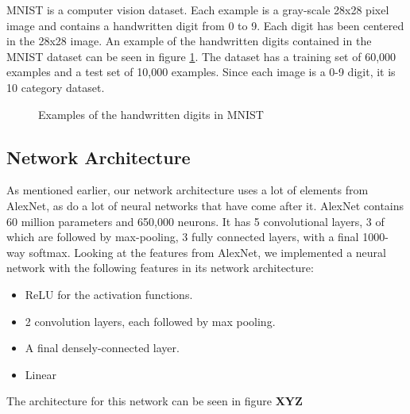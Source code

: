 \documentclass{article}
\begin{document}
MNIST is a computer vision dataset. Each example is a gray-scale 28x28 pixel image and contains a handwritten digit from 0 to 9. Each digit has been centered in the 28x28 image. An example of the handwritten digits contained in the MNIST dataset can be seen in figure \ref{fig:mnist}. The dataset has a training set of 60,000 examples and a test set of 10,000 examples. Since each image is a 0-9 digit, it is 10 category dataset.

\begin{figure}[h]
	\centering
    \quad
    \quad
    \quad
    \caption{Examples of the handwritten digits in MNIST}
    \label{fig:mnist}
\end{figure}

\subsection{Network Architecture}


As mentioned earlier, our network architecture uses a lot of elements from AlexNet, as do a lot of neural networks that have come after it. AlexNet contains 60 million parameters and 650,000 neurons. It has 5 convolutional layers, 3 of which are followed by max-pooling, 3 fully connected layers, with a final 1000-way softmax. Looking at the features from AlexNet, we implemented a neural network with the following features in its network architecture:
\begin{itemize}
	\item ReLU for the activation functions.
    \item 2 convolution layers, each followed by max pooling.
    \item A final densely-connected layer.
    \item Linear 
\end{itemize}
The architecture for this network can be seen in figure \textbf{XYZ}
\end{document}
